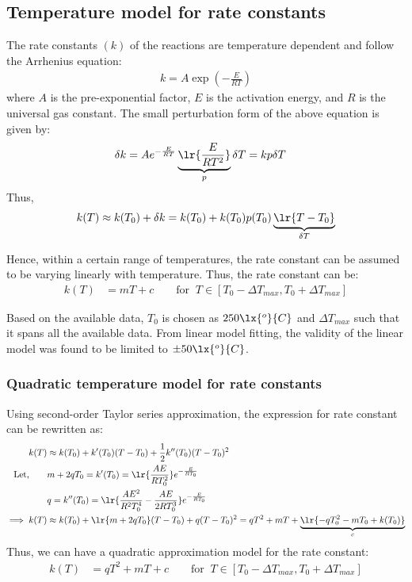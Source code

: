 \subsection{Temperature model for rate constants}
The rate constants $(k)$ of the reactions are temperature dependent and follow the Arrhenius equation:
\begin{align*}
    k = A \exp\left(-\frac{E}{RT}\right)
\end{align*}
where $A$ is the pre-exponential factor, $E$ is the activation energy, and $R$ is the universal gas constant. The small
perturbation form of the above equation is given by:
\begin{align*}
    \delta k &= A e^{-\frac{E}{RT}} \underbrace{\lr{\frac{E}{RT^2}}}_p \delta T = k p \delta T
\end{align*}
Thus,
\begin{align*}
    k(T) \approx k(T_0) + \delta k = k(T_0) + k(T_0) p(T_0) \underbrace{\lr{T - T_0}}_{\delta T}
\end{align*}

Hence, within a certain range of temperatures, the rate constant can be assumed to be varying linearly with temperature.
Thus, the rate constant can be:
\begin{align*}
    k(T) &= mT + c \qquad  \text{for } \: T \in [T_0 - \Delta T_{max}, T_0 + \Delta T_{max}]
\end{align*}

Based on the available data, $T_0$ is chosen as $250 \lx{^o}{C}$ and $\Delta T_{max}$ such that it spans all the
available data. From linear model fitting, the validity of the linear model was found to be limited to $\pm 50
\lx{^o}{C}$.

\subsubsection{Quadratic temperature model for rate constants}
Using second-order Taylor series approximation, the expression for rate constant can be rewritten as:
\begin{align*}
    k(T) &\approx k(T_0) + k'(T_0) (T - T_0) + \frac{1}{2} k''(T_0) (T - T_0)^2\\
    \text{Let,} \qquad
    &m + 2qT_0 = k'(T_0) = \lr{\frac{AE}{RT_0^2}} e^{-\frac{E}{RT_0}} \\
    &q = k''(T_0) = \lr{\frac{A E^2}{R^2 T_0^4} - \frac{A E}{2 R T_0^3}} e^{-\frac{E}{RT_0}} \\
    \implies k(T) &\approx k(T_0) + \lr{m + 2qT_0} (T - T_0) + q (T - T_0)^2
                   = q T^2 + m T + \underbrace{\lr{ -  q T_0^2 - mT_0  + k(T_0)}}_c
\end{align*}
Thus, we can have a quadratic approximation model for the rate constant:
\begin{align}
    k(T) &= q T^2 + m T + c \qquad \text{for } \: T \in [T_0 - \Delta T_{max}, T_0 + \Delta T_{max}]
\end{align}

